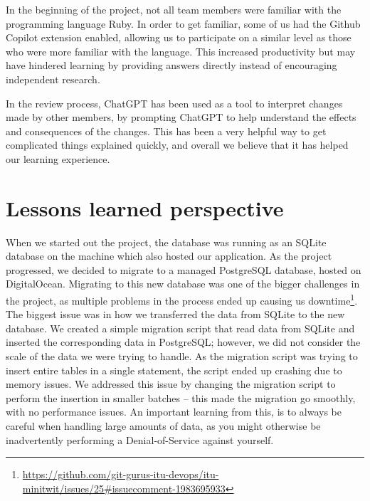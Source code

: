 \documentclass{article}
\begin{document}
In the beginning of the project, not all team members were familiar with the programming language Ruby. In order to get familiar, some of us had the Github Copilot extension enabled, allowing us to participate on a similar level as those who were more familiar with the language.
This increased productivity but may have hindered learning by providing answers directly instead of encouraging independent research.

In the review process, ChatGPT has been used as a tool to interpret changes made by other members, by prompting ChatGPT to help understand the effects and consequences of the changes. This has been a very helpful way to get complicated things explained quickly, and overall we believe that it has helped our learning experience. 

\section{Lessons learned perspective}

When we started out the project, the database was running as an SQLite database on the machine which also hosted our application. As the project progressed, we decided to migrate to a managed PostgreSQL database, hosted on DigitalOcean. Migrating to this new database was one of the bigger challenges in the project, as multiple problems in the process ended up causing us downtime\footnote{\href{https://github.com/git-gurus-itu-devops/itu-minitwit/issues/25\#issuecomment-1983695933}{https://github.com/git-gurus-itu-devops/itu-minitwit/issues/25\#issuecomment-1983695933}}.
The biggest issue was in how we transferred the data from SQLite to the new database. We created a simple migration script that read data from SQLite and inserted the corresponding data in PostgreSQL; however, we did not consider the scale of the data we were trying to handle.
As the migration script was trying to insert entire tables in a single statement, the script ended up crashing due to memory issues.
We addressed this issue by changing the migration script to perform the insertion in smaller batches -- this made the migration go smoothly, with no performance issues.
An important learning from this, is to always be careful when handling large amounts of data, as you might otherwise be inadvertently performing a Denial-of-Service against yourself.
\end{document}
